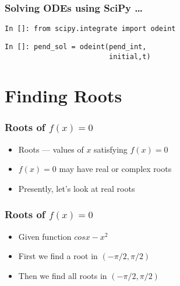 \documentclass[14pt,compress]{beamer}
\newcommand{\typ}[1]{\lstinline{#1}}
\begin{document}
\begin{frame}[fragile]
\frametitle{Solving ODEs using SciPy \ldots}
\typ{In []: from scipy.integrate import odeint}
\begin{lstlisting}
In []: pend_sol = odeint(pend_int, 
                         initial,t)
\end{lstlisting}
\end{frame}

\section{Finding Roots}

\begin{frame}[fragile]
\frametitle{Roots of $f(x)=0$}
\begin{itemize}
\item Roots --- values of $x$ satisfying $f(x)=0$
\item $f(x)=0$ may have real or complex roots
\item Presently, let's look at real roots
\end{itemize}
\end{frame}

\begin{frame}[fragile]
\frametitle{Roots of $f(x)=0$}
\begin{itemize}
\item Given function $cosx-x^2$ 
\item First we find \alert{a} root in $(-\pi/2, \pi/2)$
\item Then we find \alert{all} roots in $(-\pi/2, \pi/2)$
\end{itemize}
\end{frame}


\end{document}
